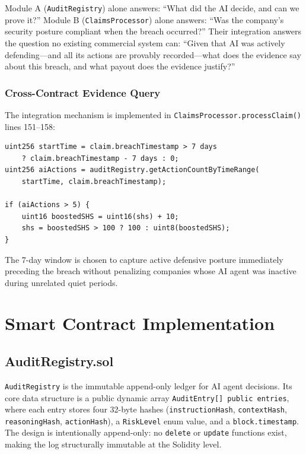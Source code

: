 \documentclass[12pt,a4paper]{article}
\begin{document}
Module A (\texttt{AuditRegistry}) alone answers: ``What did the AI
decide, and can we prove it?'' Module B (\texttt{ClaimsProcessor})
alone answers: ``Was the company's security posture compliant when the
breach occurred?'' Their integration answers the question no existing
commercial system can: ``Given that AI was actively defending---and all
its actions are provably recorded---what does the evidence say about
this breach, and what payout does the evidence justify?''

\subsubsection{Cross-Contract Evidence Query}

The integration mechanism is implemented in
\texttt{ClaimsProcessor.processClaim()} lines 151--158:

\begin{lstlisting}[style=aegiscode, language=Solidity,
  caption={Cross-contract AI evidence query in processClaim()}]
uint256 startTime = claim.breachTimestamp > 7 days
    ? claim.breachTimestamp - 7 days : 0;
uint256 aiActions = auditRegistry.getActionCountByTimeRange(
    startTime, claim.breachTimestamp);

if (aiActions > 5) {
    uint16 boostedSHS = uint16(shs) + 10;
    shs = boostedSHS > 100 ? 100 : uint8(boostedSHS);
}
\end{lstlisting}

The 7-day window is chosen to capture active defensive posture
immediately preceding the breach without penalizing companies whose
AI agent was inactive during unrelated quiet periods.

\section{Smart Contract Implementation}
\label{sec:contracts}

\subsection{AuditRegistry.sol}
\label{sec:audit-registry}

\texttt{AuditRegistry} is the immutable append-only ledger for AI
agent decisions. Its core data structure is a public dynamic array
\texttt{AuditEntry[] public entries}, where each entry stores four
32-byte hashes (\texttt{instructionHash}, \texttt{contextHash},
\texttt{reasoningHash}, \texttt{actionHash}), a
\texttt{RiskLevel} enum value, and a \texttt{block.timestamp}.
The design is intentionally append-only: no \texttt{delete} or
\texttt{update} functions exist, making the log structurally immutable
at the Solidity level.
\end{document}
